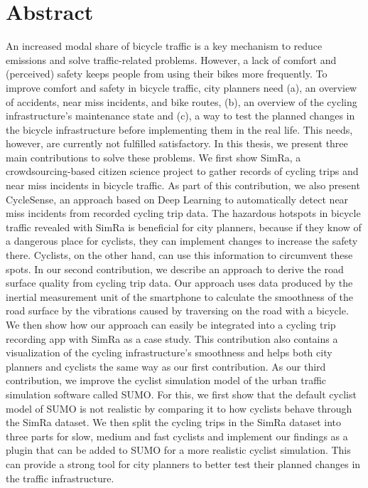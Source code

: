
\cleardoublepage
{}
\section*{Abstract}
An increased modal share of bicycle traffic is a key mechanism to reduce emissions and solve traffic-related problems.
However, a lack of comfort and (perceived) safety keeps people from using their bikes more frequently.
To improve comfort and safety in bicycle traffic, city planners need (a), an overview of accidents, near miss incidents, and bike routes, (b), an overview of the cycling infrastructure's maintenance state and (c), a way to test the planned changes in the bicycle infrastructure before implementing them in the real life.
This needs, however, are currently not fulfilled satisfactory.
In this thesis, we present three main contributions to solve these problems.
We first show SimRa, a crowdsourcing-based citizen science project to gather records of cycling trips and near miss incidents in bicycle traffic.
As part of this contribution, we also present CycleSense, an approach based on Deep Learning to automatically detect near miss incidents from recorded cycling trip data.
The hazardous hotspots in bicycle traffic revealed with SimRa is beneficial for city planners, because if they know of a dangerous place for cyclists, they can implement changes to increase the safety there.
Cyclists, on the other hand, can use this information to circumvent these spots.
In our second contribution, we describe an approach to derive the road surface quality from cycling trip data.
Our approach uses data produced by the inertial measurement unit of the smartphone to calculate the smoothness of the road surface by the vibrations caused by traversing on the road with a bicycle. 
We then show how our approach can easily be integrated into a cycling trip recording app with SimRa as a case study.
This contribution also contains a visualization of the cycling infrastructure's smoothness and helps both city planners and cyclists the same way as our first contribution.
As our third contribution, we improve the cyclist simulation model of the urban traffic simulation software called SUMO.
For this, we first show that the default cyclist model of SUMO is not realistic by comparing it to how cyclists behave through the SimRa dataset.
We then split the cycling trips in the SimRa dataset into three parts for slow, medium and fast cyclists and implement our findings as a plugin that can be added to SUMO for a more realistic cyclist simulation.
This can provide a strong tool for city planners to better test their planned changes in the traffic infrastructure. 


